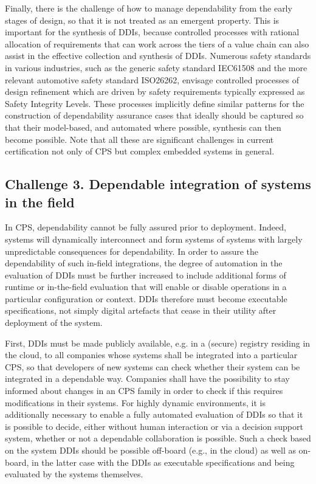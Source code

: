 Finally, there is the challenge of how to manage dependability from the early stages of design, so that it is not treated as an emergent property. This is important for the synthesis of DDIs, because controlled processes with rational allocation of requirements that can work across the tiers of a value chain can also assist in the effective collection and synthesis of DDIs. Numerous safety standards in various industries, such as the generic safety standard IEC61508 and the more relevant automotive safety standard ISO26262, envisage controlled processes of design refinement which are driven by safety requirements typically expressed as Safety Integrity Levels. These processes implicitly define similar patterns for the construction of dependability assurance cases that ideally should be captured so that their model-based, and automated where possible, synthesis can then become possible. Note that all these are significant challenges in current certification not only of CPS but complex embedded systems in general.  


\subsection{Challenge 3. Dependable integration of systems in the field}

In CPS, dependability cannot be fully assured prior to deployment. Indeed, systems will dynamically interconnect and form systems of systems with largely unpredictable consequences for dependability. In order to assure the dependability of such in-field integrations, the degree of automation in the evaluation of DDIs must be further increased to include additional forms of runtime or in-the-field evaluation that will enable or disable operations in a particular configuration or context. DDIs therefore must become executable specifications, not simply digital artefacts that cease in their utility after deployment of the system.  

First, DDIs must be made publicly available, e.g. in a (secure) registry residing in the cloud, to all companies whose systems shall be integrated into a particular CPS, so that developers of new systems can check whether their system can be integrated in a dependable way. Companies shall have the possibility to stay informed about changes in an CPS family in order to check if this requires modifications in their systems. For highly dynamic environments, it is additionally necessary to enable a fully automated evaluation of DDIs so that it is possible to decide, either without human interaction or via a decision support system, whether or not a dependable collaboration is possible. Such a check based on the system DDIs should be possible off-board (e.g., in the cloud) as well as on-board, in the latter case with the DDIs as executable specifications and being evaluated by the systems themselves.


